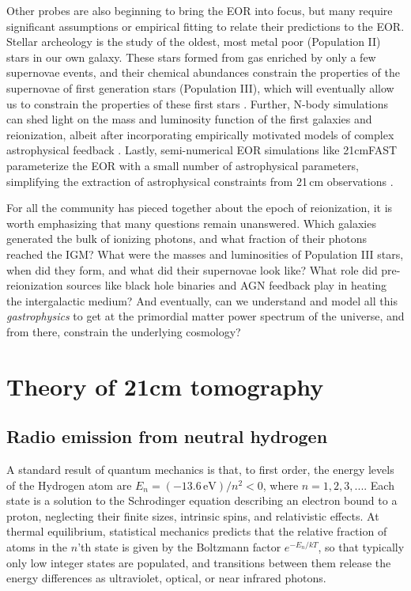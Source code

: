 Other probes are also beginning to bring the EOR into focus, but many require significant assumptions or empirical fitting to relate their predictions to the EOR. Stellar archeology is the study of the oldest, most metal poor (Population II) stars in our own galaxy. These stars formed from gas enriched by only a few supernovae events, and their chemical abundances constrain the properties of the supernovae of first generation stars (Population III), which will eventually allow us to constrain the properties of these first stars \citep{Frebel2015}. Further, N-body simulations can shed light on the mass and luminosity function of the first galaxies and reionization, albeit after incorporating empirically motivated models of complex astrophysical feedback \citep{Bauer2015,Vogelsberger2014} . Lastly, semi-numerical EOR simulations like 21cmFAST \citep{21cmfast} parameterize the EOR with a small number of astrophysical parameters, simplifying the extraction of astrophysical constraints from 21\,cm observations \citep{PoberNextGen,PoberPAPER64Heating}. 

For all the community has pieced together about the epoch of reionization, it is worth emphasizing that many questions remain unanswered. Which galaxies generated the bulk of ionizing photons, and what fraction of their photons reached the IGM? What were the masses and luminosities of Population III stars, when did they form, and what did their supernovae look like? What role did pre-reionization sources like black hole binaries and AGN feedback play in heating the intergalactic medium? And eventually, can we understand and model all this \textit{gastrophysics} to get at the primordial matter power spectrum of the universe, and from there, constrain the underlying cosmology?

\section{Theory of 21cm tomography}
\label{sec:intro21cmsection}

\subsection{Radio emission from neutral hydrogen}

A standard result of quantum mechanics \citep[e.g.,][]{griffithsqm} is that, to first order, the energy levels of the Hydrogen atom are $E_n=(-13.6\,\text{eV})/n^2<0$, where $n=1,2,3,...$. Each state is a solution to the Schrodinger equation describing an electron bound to a proton, neglecting their finite sizes, intrinsic spins, and relativistic effects. At thermal equilibrium, statistical mechanics predicts that the relative fraction of atoms in the $n$'th state is given by the Boltzmann factor $e^{-E_n/kT}$, so that typically only low integer states are populated, and transitions between them release the energy differences as ultraviolet, optical, or near infrared photons. 

